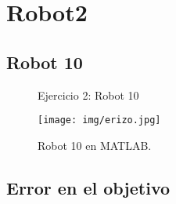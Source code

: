 \section{\textbf{Robot2}}
\subsection{\textbf{Robot 10}}

\begin{figure}[H]
	\centering
	\hfill
	\caption{Ejercicio 2: Robot 10}
	\label{fig:Robot10}
\end{figure}
\begin{figure}[H]
	\centering
	\texttt{[image: img/erizo.jpg]}
	\caption{Robot 10 en MATLAB.}
	\label{fig:Robot10matlab}
\end{figure}
\subsection{\textbf{Error en el objetivo}}